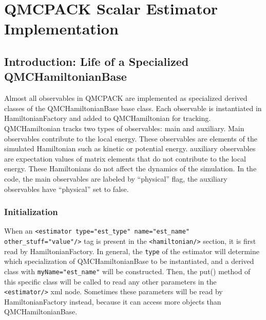 \documentclass[aps,prl,preprint]{revtex4-1}
\begin{document}
\section{QMCPACK Scalar Estimator Implementation}
\subsection{Introduction: Life of a Specialized QMCHamiltonianBase}

Almost all observables in QMCPACK are implemented as specialized derived classes of the QMCHamiltonianBase base class. Each observable is instantiated in HamiltonianFactory and added to QMCHamiltonian for tracking. QMCHamiltonian tracks two types of observables: main and auxiliary. Main observables contribute to the local energy. These observables are elements of the simulated Hamiltonian such as kinetic or potential energy. auxiliary observables are expectation values of matrix elements that do not contribute to the local energy. These Hamiltonians do not affect the dynamics of the simulation. In the code, the main observables are labeled by ``physical'' flag, the auxiliary observables have ``physical'' set to false.

\subsubsection{Initialization}
When an \verb|<estimator type="est_type" name="est_name" other_stuff="value"/>| tag is present in the \verb|<hamiltonian/>| section, it is first read by HamiltonianFactory. In general, the \verb|type| of the estimator will determine which specialization of QMCHamiltonianBase to be instantiated, and a derived class with \verb|myName="est_name"| will be constructed. Then, the put() method of this specific class will be called to read any other parameters in the \verb|<estimator/>| xml node. Sometimes these parameters will be read by HamiltonianFactory instead, because it can access more objects than QMCHamiltonianBase.
\end{document}
